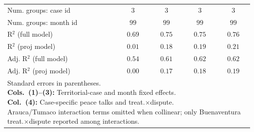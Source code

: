 \begin{table}
\begin{center}
\begin{tabular}{l c c c c}
Num. groups: case id                & $3$      & $3$           & $3$           & $3$           \\
Num. groups: month id               & $99$     & $99$          & $99$          & $99$          \\
R$^2$ (full model)                   & $0.69$   & $0.75$        & $0.75$        & $0.76$        \\
R$^2$ (proj model)                   & $0.01$   & $0.18$        & $0.19$        & $0.21$        \\
Adj. R$^2$ (full model)              & $0.54$   & $0.61$        & $0.62$        & $0.62$        \\
Adj. R$^2$ (proj model)              & $0.00$   & $0.17$        & $0.18$        & $0.19$        \\
\bottomrule
\multicolumn{5}{l}{\scriptsize{\parbox{\linewidth}{Standard errors in parentheses.\\[0.35em] \textbf{Cols.~(1)--(3):} Territorial-case and month fixed effects.\\[0.35em] \textbf{Col.~(4):} Case-specific peace talks and treat.$\times$dispute.\\[0.35em] Arauca/Tumaco interaction terms omitted when collinear; only Buenaventura treat.$\times$dispute reported among interactions.}}}
\end{tabular}
\label{tab:results_twfe}
\end{center}
\end{table}
